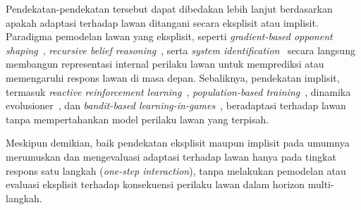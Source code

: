 Pendekatan-pendekatan tersebut dapat dibedakan lebih lanjut berdasarkan apakah adaptasi terhadap lawan ditangani secara eksplisit atau implisit. Paradigma pemodelan lawan yang eksplisit, seperti \textit{gradient-based opponent shaping}~\cite{qiao_o2m_2024, hu_modeling_2023, wang_achieving_2019}, \textit{recursive belief reasoning}~\cite{freire_modeling_2023, de_weerd_higher-order_2022}, serta \textit{system identification}~\cite{li_exploiting_2025} secara langsung membangun representasi internal perilaku lawan untuk memprediksi atau memengaruhi respons lawan di masa depan. Sebaliknya, pendekatan implisit, termasuk \textit{reactive reinforcement learning}~\cite{lv_inducing_2023}, \textit{population-based training}~\cite{perera_learning_2025}, dinamika evolusioner~\cite{zhu_evolutionary_2025, di_coupling_2023, elhamer_effects_2020}, dan \textit{bandit-based learning-in-games}~\cite{gomez_grounded_2025}, beradaptasi terhadap lawan tanpa mempertahankan model perilaku lawan yang terpisah.

Meskipun demikian, baik pendekatan eksplisit maupun implisit pada umumnya merumuskan dan mengevaluasi adaptasi terhadap lawan hanya pada tingkat respons satu langkah (\textit{one-step interaction}), tanpa melakukan pemodelan atau evaluasi eksplisit terhadap konsekuensi perilaku lawan dalam horizon multi-langkah.

